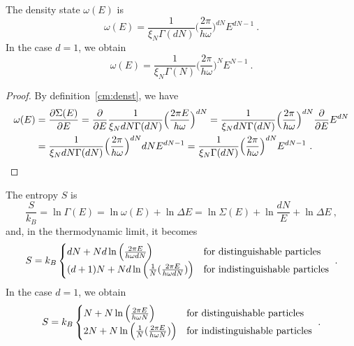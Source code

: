     The density state $\omega(E)$ is
    \begin{equation}\label{harmosc}
        \omega (E) = \frac{1}{\xi_N \Gamma (dN)} \Big (\frac{2 \pi}{h \omega} \Big )^{dN} E^{dN-1} ~.
    \end{equation}
    In the case $d = 1$, we obtain 
    \begin{equation*}
        \omega (E) = \frac{1}{\xi_N \Gamma (N)} \Big (\frac{2 \pi}{h \omega} \Big )^{N} E^{N-1} ~.
    \end{equation*}
    \begin{proof}
        By definition~\eqref{cm:denst}, we have
        \begin{equation*}
        \begin{aligned}
            \omega (E) & = \frac{\partial\Sigma (E)}{\partial E} = \frac{\partial}{\partial E} \frac{1}{\xi_N dN \Gamma (dN)} \Big (\frac{2 \pi E}{h \omega} \Big )^{dN} = \frac{1}{\xi_N dN \Gamma (dN)} \Big (\frac{2 \pi}{h \omega} \Big )^{dN} \frac{\partial}{\partial E} E^{dN} \\ & = \frac{1}{\xi_N dN \Gamma (dN)} \Big (\frac{2 \pi}{h \omega} \Big )^{dN} dN E^{dN-1} = \frac{1}{\xi_N \Gamma (dN)} \Big (\frac{2 \pi}{h \omega} \Big )^{dN} E^{dN-1} ~.
        \end{aligned}
        \end{equation*}
    \end{proof}
    The entropy $S$ is
    \begin{equation*}
        \frac{S}{k_B} = \ln \Gamma(E) = \ln \omega(E) + \ln \Delta E = \ln \Sigma(E) + \ln \frac{dN}{E} + \ln \Delta E ~,
    \end{equation*}
    and, in the thermodynamic limit, it becomes
    \begin{equation*}
        S = k_B \begin{cases}
            d N + N d \ln \Big (\frac{2 \pi E }{h \omega d N} \Big) & \textnormal{for distinguishable particles} \\
            (d+1) N + N d \ln \Big ( \frac{1}{N} (\frac{2 \pi E }{h \omega d N} ) \Big ) & \textnormal{for indistinguishable particles} \\
        \end{cases} ~.
    \end{equation*}
    In the case $d = 1$, we obtain 
    \begin{equation*}
        S = k_B \begin{cases}
            N + N \ln \Big (\frac{2 \pi E }{h \omega N} \Big)  & \textnormal{for distinguishable particles} \\
            2N + N \ln \Big ( \frac{1}{N} (\frac{2 \pi E }{h \omega N} ) \Big ) & \textnormal{for indistinguishable particles} \\
        \end{cases} ~.
    \end{equation*}
